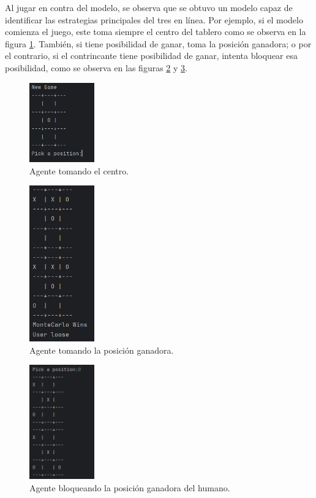 Al jugar en contra del modelo, se observa que se obtuvo un modelo capaz de identificar las estrategias principales del tres en línea. Por ejemplo, si el modelo comienza el juego, este toma siempre el centro del tablero como se observa en la figura \ref{fig:monte_carlo_center}. También, si tiene posibilidad de ganar, toma la posición ganadora; o por el contrario, si el contrincante tiene posibilidad de ganar, intenta bloquear esa posibilidad, como se observa en las figuras \ref{fig:monte_carlo_win} y \ref{fig:monte_carlo_block}.

\clearpage

\begin{figure}[htbp]
	\centering
	\includegraphics[width=0.25\textwidth]{./Figures/monte_carlo_center.png}
	\caption{Agente tomando el centro.}
	\label{fig:monte_carlo_center}
\end{figure}

\begin{figure}[htbp]
	\centering
	\includegraphics[width=0.25\textwidth]{./Figures/monte_carlo_win.png}
	\caption{Agente tomando la posición ganadora.}
	\label{fig:monte_carlo_win}
\end{figure}

\begin{figure}[hbt!]
	\centering
	\includegraphics[width=0.25\textwidth]{./Figures/monte_carlo_block.png}
	\caption{Agente bloqueando la posición ganadora del humano.}
	\label{fig:monte_carlo_block}
\end{figure}

